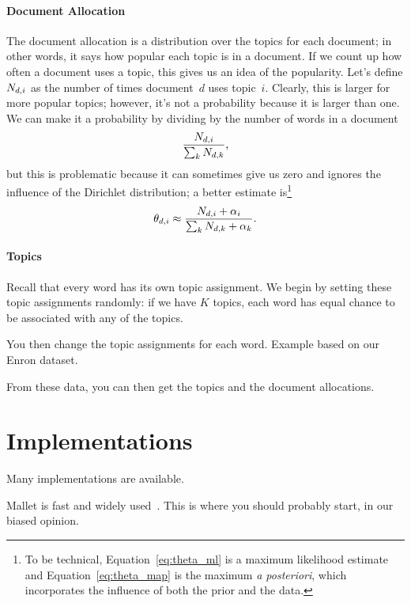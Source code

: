 \paragraph{Document Allocation} The document allocation is a distribution over
the topics for each document; in other words, it says how popular each topic is
in a document.  If we count up how often a document uses a topic, this gives us
an idea of the popularity.  Let's define $N_{d,i}$ as the number of times
document~$d$ uses topic~$i$.  Clearly, this is larger for more popular topics;
however, it's not a probability because it is larger than one.  We can make it a
probability by dividing by the number of words in a document
\begin{equation}
\frac{N_{d,i}}{\sum_k N_{d,k}},
\label{eq:theta_ml}
\end{equation}
but this is problematic because it can sometimes give us zero and ignores the
influence of the Dirichlet distribution; a better estimate is\footnote{To be
  technical, Equation~\ref{eq:theta_ml} is a maximum likelihood estimate and
  Equation~\ref{eq:theta_map} is the maximum \textit{a posteriori}, which
  incorporates the influence of both the prior and the data.}
\begin{equation}
\theta_{d,i} \approx \frac{N_{d,i} + \alpha_i}{\sum_k N_{d,k} + \alpha_k}.
\label{eq:theta_map}
\end{equation}

\paragraph{Topics}

Recall that every word has its own topic assignment.  We begin by setting these
topic assignments randomly: if we have $K$ topics, each word has equal chance to
be associated with any of the topics.

You then change the topic assignments for each word. Example based on
our Enron dataset.

From these data, you can then get the topics and the document
allocations.

\section{Implementations}

Many implementations are available.

Mallet is fast and widely used~\citep{mallet}.  This is where you
should probably start, in our biased opinion.

